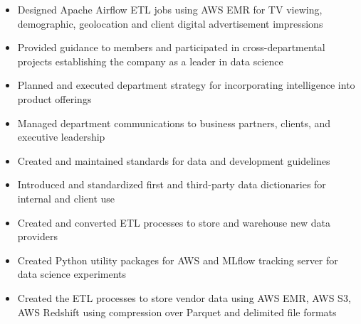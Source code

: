 
\ProjectExperienceExpandedOneSectionCont
{
    \begin{itemize}
        \item Designed Apache Airflow ETL jobs using AWS EMR for TV viewing,
        demographic, geolocation and client digital advertisement impressions
    \end{itemize}
}
{
    \begin{itemize}
        \item Provided guidance to members and participated in
        cross-departmental projects establishing the company as a leader in data
        science
        \item Planned and executed department strategy for incorporating
        intelligence into product offerings
        \item Managed department communications to business partners, clients,
        and executive leadership
        \item Created and maintained standards for data and development
        guidelines
        \item Introduced and standardized first and third-party data
        dictionaries for internal and client use
        \item Created and converted ETL processes to store and warehouse new
        data providers
        \item Created Python utility packages for AWS and MLflow tracking server
        for data science experiments
        \item Created the ETL processes to store vendor data using AWS EMR, AWS
        S3, AWS Redshift using compression over Parquet and delimited file
        formats
    \end{itemize}
}

\vspace*{0.05 in}

